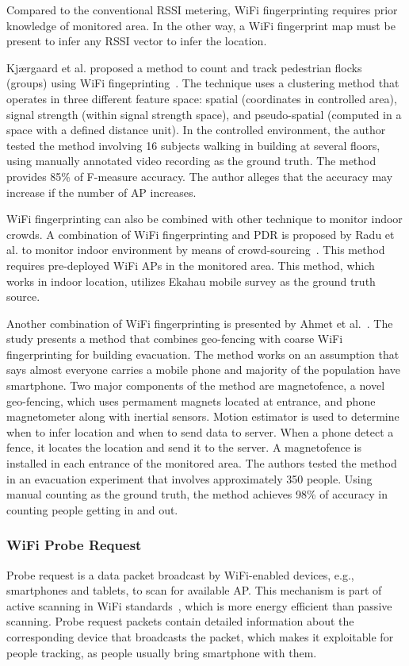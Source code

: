 	Compared to the conventional \ac{RSSI} metering, WiFi fingerprinting requires prior knowledge of monitored area. In the other way, a WiFi fingerprint map must be present to infer any \ac{RSSI} vector to infer the location.

	Kj{\ae}rgaard et al. proposed a method to count and track pedestrian flocks (groups) using WiFi fingeprinting~\cite{thesis033}. The technique uses a clustering method that operates in three different feature space: spatial (coordinates in controlled area), signal strength (within signal strength space), and pseudo-spatial (computed in a space with a defined distance unit). In the controlled environment, the author tested the method involving 16 subjects walking in building at several floors, using manually annotated video recording as the ground truth. The method provides 85\% of F-measure accuracy. The author alleges that the accuracy may increase if the number of \ac{AP} increases.

	WiFi fingerprinting can also be combined with other technique to monitor indoor crowds. A combination of WiFi fingerprinting and \ac{PDR} is proposed by Radu et al. to monitor indoor environment by means of crowd-sourcing~\cite{thesis020}. This method requires pre-deployed WiFi \ac{AP}s in the monitored area. This method, which works in indoor location, utilizes Ekahau mobile survey as the ground truth source.

	Another combination of WiFi fingerprinting is presented by Ahmet et al.~\cite{thesis045}. The study presents a method that combines geo-fencing with coarse WiFi fingerprinting for building evacuation. The method works on an assumption that says almost everyone carries a mobile phone and majority of the population have smartphone. Two major components of the method are magnetofence, a novel geo-fencing, which uses permament magnets located at entrance, and phone magnetometer along with inertial sensors. Motion estimator is used to determine when to infer location and when to send data to server. When a phone detect a fence, it locates the location and send it to the server. A magnetofence is installed in each entrance of the monitored area. The authors tested the method in an evacuation experiment that involves approximately 350 people. Using manual counting as the ground truth, the method achieves 98\% of accuracy in counting people getting in and out.
	


	\subsubsection{WiFi Probe Request} %
	\label{ssub:wifi_probe_request}
	Probe request is a data packet broadcast by WiFi-enabled devices, e.g., smartphones and tablets, to scan for available \ac{AP}. This mechanism is part of active scanning in WiFi standards~\cite{thesis082}, which is more energy efficient than passive scanning. Probe request packets contain detailed information about the corresponding device that broadcasts the packet, which makes it exploitable for people tracking, as people usually bring smartphone with them.

